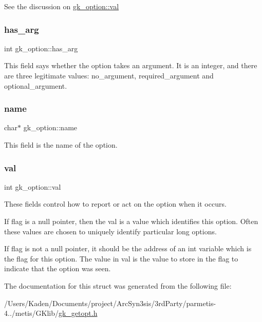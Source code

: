 See the discussion on \hyperlink{a00630_abf964c7489d269515ec8e5e62b2164ba}{gk\+\_\+option\+::val} \mbox{\label{a00630_a66d2ab88446836cef777d756098151f5}} 
\subsubsection{\texorpdfstring{has\+\_\+arg}{has\_arg}}
{\footnotesize\ttfamily int gk\+\_\+option\+::has\+\_\+arg}

This field says whether the option takes an argument. It is an integer, and there are three legitimate values\+: no\+\_\+argument, required\+\_\+argument and optional\+\_\+argument. \mbox{\label{a00630_aa47d0e4e90d3cd1793fc5344b1e99afc}} 
\subsubsection{\texorpdfstring{name}{name}}
{\footnotesize\ttfamily char$\ast$ gk\+\_\+option\+::name}

This field is the name of the option. \mbox{\label{a00630_abf964c7489d269515ec8e5e62b2164ba}} 
\subsubsection{\texorpdfstring{val}{val}}
{\footnotesize\ttfamily int gk\+\_\+option\+::val}

These fields control how to report or act on the option when it occurs.

If flag is a null pointer, then the val is a value which identifies this option. Often these values are chosen to uniquely identify particular long options.

If flag is not a null pointer, it should be the address of an int variable which is the flag for this option. The value in val is the value to store in the flag to indicate that the option was seen. 

The documentation for this struct was generated from the following file\+:\begin{DoxyCompactItemize}
\item 
/\+Users/\+Kaden/\+Documents/project/\+Arc\+Syn3sis/3rd\+Party/parmetis-\/4../metis/\+G\+Klib/\hyperlink{a00050}{gk\+\_\+getopt.\+h}\end{DoxyCompactItemize}
